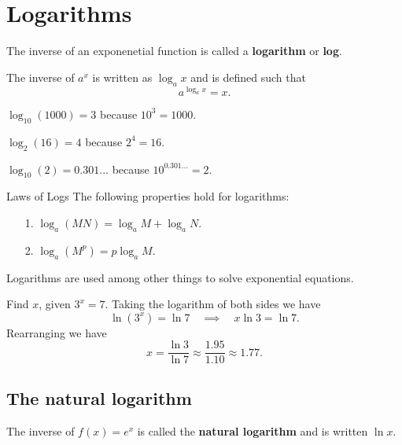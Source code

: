\section{Logarithms}
\begin{definition}
The inverse of an exponenetial function is called a \textbf{logarithm} or \textbf{log}.

The inverse of $a^x$ is written as $\log_a x$ and is defined such that $$a^{\log_a x} = x.$$
\end{definition}
\begin{example}
$\log_{10}(1000)=3$ because $10^3=1000$.

$\log_{2}(16)=4$ because $2^4=16$.

$\log_{10}(2)=0.301...$ because $10^{0.301...}=2$.
\end{example}

\begin{thing}{Laws of Logs}
The following properties hold for logarithms:
\begin{itemize}
\item[1.] $\log_a(MN)=\log_aM + \log_aN$.
\item[2.] $\log_a(M^p)=p\log_aM$.
\end{itemize}
\end{thing}

Logarithms are used among other things to solve exponential equations.

\begin{example}
Find $x$, given $3^x=7$. Taking the logarithm of both sides we have
\[\ln(3^x)=\ln7 \quad \implies \quad x\ln 3=\ln 7.\]
Rearranging we have
\[x=\frac{\ln 3}{\ln 7}\approx\frac{1.95}{1.10}\approx1.77.\]
\end{example}



\subsection{The natural logarithm}
\begin{definition}
The inverse of $f(x)=e^x$ is called the \textbf{natural logarithm} and is written $\ln x$.
\end{definition}

